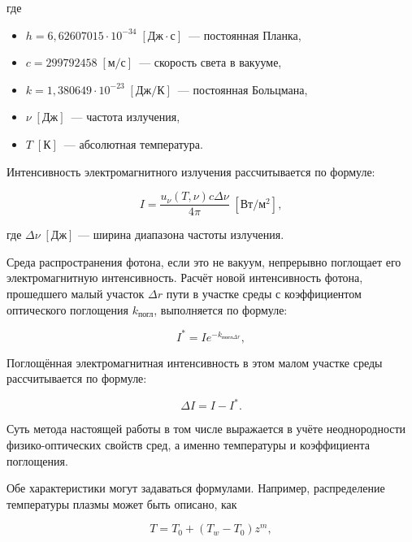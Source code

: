 \noindent где
\begin{itemize}
	\item $h = 6,62607015 \cdot 10^{-34} \; \left[\text{Дж}\cdot\text{с}\right]$~— постоянная Планка,
	\item $c = 299792458 \; \left[\text{м}/\text{с}\right]$~— скорость света в вакууме,
	\item $k = 1,380649 \cdot 10^{-23} \; \left[\text{Дж}/\text{К}\right]$~— постоянная Больцмана,
	\item $\nu \; \left[\text{Дж}\right]$~— частота излучения,
	\item $T \; \left[\text{К}\right]$~— абсолютная температура.
\end{itemize}

Интенсивность электромагнитного излучения рассчитывается по формуле:

\begin{equation}
	\label{eqn:intensity-plank}
	I = \frac{u_\nu(T, \nu)c\Delta\nu}{4\pi} \; \left[\text{Вт}/\text{м}^2\right],
\end{equation}

\noindent где $\Delta\nu \; \left[\text{Дж}\right]$ — ширина диапазона частоты излучения.

Среда распространения фотона, если это не вакуум, непрерывно поглощает его электромагнитную интенсивность.
Расчёт новой интенсивность фотона, прошедшего малый участок $\Delta r$ пути в участке среды с коэффициентом оптического поглощения $k_{\text{погл}}$, выполняется по формуле:

\begin{equation}
	\label{eqn:intensity-begin}
	I^* = Ie^{-k_{\text{погл}\Delta r}},
\end{equation}

Поглощённая электромагнитная интенсивность в этом малом участке среды рассчитывается по формуле:

\begin{equation}
	\label{eqn:intensity-end}
	\Delta I = I - I^*.
\end{equation}

Суть метода настоящей работы в том числе выражается в учёте неоднородности физико-оптических свойств сред, а именно температуры и коэффициента поглощения.

Обе характеристики могут задаваться формулами.
Например, распределение температуры плазмы может быть описано, как

\begin{equation}
	\label{eqn:xenon-temperature}
	T = T_0 + (T_w - T_0)z^m,
\end{equation}

